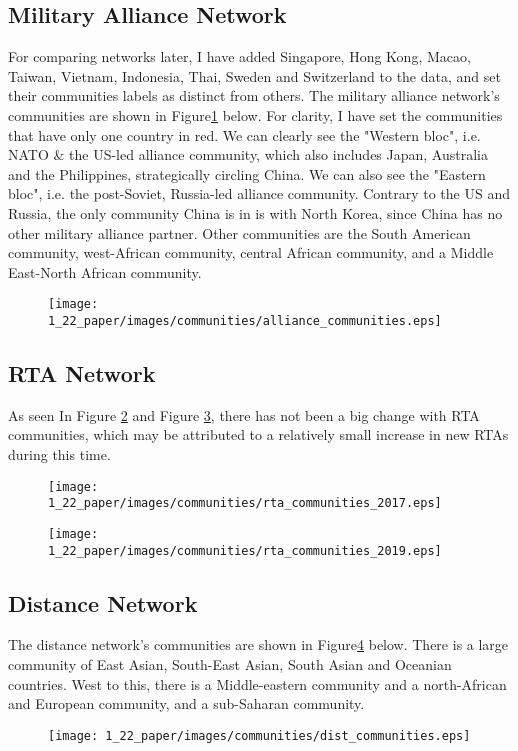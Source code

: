\documentclass[a4paper, 12pt]{article}
\begin{document}
\subsection{Military Alliance Network}
For comparing networks later, I have added Singapore, Hong Kong, Macao, Taiwan, Vietnam, Indonesia, Thai, Sweden and Switzerland to the data, and set their communities labels as distinct from others.
The military alliance network's communities are shown in Figure\ref{fig:alliance_comm} below.
For clarity, I have set the communities that have only one country in red.
We can clearly see the "Western bloc", i.e. NATO \& the US-led alliance community, which also includes Japan, Australia and the Philippines, strategically circling China.
We can also see the "Eastern bloc", i.e. the post-Soviet, Russia-led alliance community.
Contrary to the US and Russia, the only community China is in is with North Korea, since China has no other military alliance partner.
Other communities are the South American community, west-African community, central African community, and a Middle East-North African community.
\begin{figure}[H]
    \centering
    \texttt{[image: 1\_22\_paper/images/communities/alliance\_communities.eps]}
    \caption{}
    \label{fig:alliance_comm}
\end{figure}

\newpage
\subsection{RTA Network}
As seen In Figure \ref{fig:rta_2017} and Figure \ref{fig:rta_2019}, there has not been a big change with RTA communities, which may be attributed to a relatively small increase in new RTAs during this time.
\begin{figure}[H]
    \centering
    \texttt{[image: 1\_22\_paper/images/communities/rta\_communities\_2017.eps]}
    \caption{}
    \label{fig:rta_2017}
\end{figure}

\begin{figure}[H]
    \centering
    \texttt{[image: 1\_22\_paper/images/communities/rta\_communities\_2019.eps]}
    \caption{}
    \label{fig:rta_2019}
\end{figure}

\newpage
\subsection{Distance Network}
The distance network's communities are shown in Figure\ref{fig:distance} below.
There is a large community of East Asian, South-East Asian, South Asian and Oceanian countries.
West to this, there is a Middle-eastern community and a north-African and European community, and a sub-Saharan community.
\begin{figure}[H]
    \centering
    \texttt{[image: 1\_22\_paper/images/communities/dist\_communities.eps]}
    \caption{}
    \label{fig:distance}
\end{figure}
\end{document}
